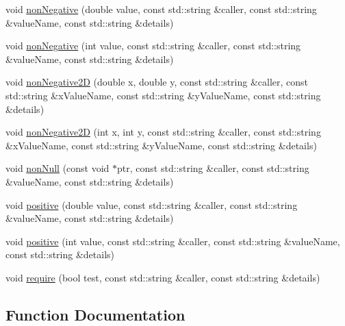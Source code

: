 \begin{DoxyCompactItemize}
\item 
void \mbox{\hyperlink{namespacerequire_a1ea7fb60c9f1e4facc46b4fba5e0a924}{non\+Negative}} (double value, const std\+::string \&caller, const std\+::string \&value\+Name, const std\+::string \&details)
\item 
void \mbox{\hyperlink{namespacerequire_a40cad20a5826d829aaf4083c27175b05}{non\+Negative}} (int value, const std\+::string \&caller, const std\+::string \&value\+Name, const std\+::string \&details)
\item 
void \mbox{\hyperlink{namespacerequire_a2214293651f178b5b1f1a286537328bf}{non\+Negative2D}} (double x, double y, const std\+::string \&caller, const std\+::string \&x\+Value\+Name, const std\+::string \&y\+Value\+Name, const std\+::string \&details)
\item 
void \mbox{\hyperlink{namespacerequire_ad0791f9f281c785969854c26f3506ac4}{non\+Negative2D}} (int x, int y, const std\+::string \&caller, const std\+::string \&x\+Value\+Name, const std\+::string \&y\+Value\+Name, const std\+::string \&details)
\item 
void \mbox{\hyperlink{namespacerequire_a3be177878a4f956f7130efa7fe161309}{non\+Null}} (const void $\ast$ptr, const std\+::string \&caller, const std\+::string \&value\+Name, const std\+::string \&details)
\item 
void \mbox{\hyperlink{namespacerequire_a332040c87f61ff35778acdf5ad074d57}{positive}} (double value, const std\+::string \&caller, const std\+::string \&value\+Name, const std\+::string \&details)
\item 
void \mbox{\hyperlink{namespacerequire_a64d94146fb46d01da7e8eb081c76562d}{positive}} (int value, const std\+::string \&caller, const std\+::string \&value\+Name, const std\+::string \&details)
\item 
void \mbox{\hyperlink{namespacerequire_a31784ceeaf8596385d87a754c2bf3aba}{require}} (bool test, const std\+::string \&caller, const std\+::string \&details)
\end{DoxyCompactItemize}


\subsection{Function Documentation}
\mbox{\label{namespacerequire_ad78e30d90d1c87a2b922f89edabbef38}} 
